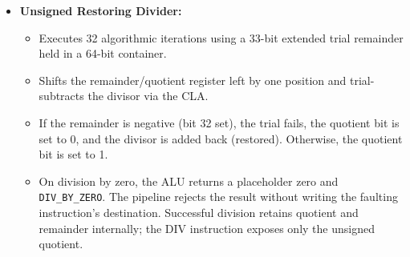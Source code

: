 \documentclass[11pt,a4paper]{article}
\begin{document}
\begin{itemize}
    \item \textbf{Unsigned Restoring Divider:}
    \begin{itemize}
        \item Executes 32 algorithmic iterations using a 33-bit extended trial remainder held in a 64-bit container.
        \item Shifts the remainder/quotient register left by one position and trial-subtracts the divisor via the CLA.
        \item If the remainder is negative (bit 32 set), the trial fails, the quotient bit is set to 0, and the divisor is added back (restored). Otherwise, the quotient bit is set to 1.
        \item On division by zero, the ALU returns a placeholder zero and \texttt{DIV\_BY\_ZERO}. The pipeline rejects the result without writing the faulting instruction's destination. Successful division retains quotient and remainder internally; the DIV instruction exposes only the unsigned quotient.
    \end{itemize}
\end{itemize}
\end{document}
